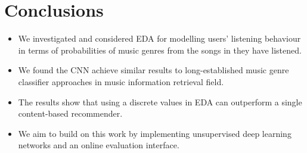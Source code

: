 
\section{Conclusions}

\begin{itemize}
\item We investigated and considered EDA for modelling users' listening behaviour in terms of probabilities of music genres from the songs in they have listened.
\item We found the CNN achieve similar results to long-established music genre classifier approaches in music information retrieval field.
\item The results show that using a discrete values in EDA can outperform a single content-based recommender.
\item We aim to build on this work by implementing unsupervised deep learning networks and an online evaluation interface.
\end{itemize}
